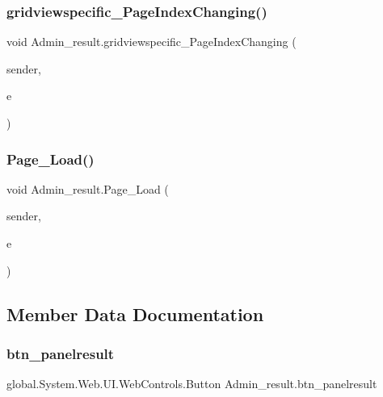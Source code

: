 \mbox{\label{class_admin__result_a49a732d0a1d0168c0895685950216e82}} 
\subsubsection{\texorpdfstring{gridviewspecific\_PageIndexChanging()}{gridviewspecific\_PageIndexChanging()}}
{\footnotesize\ttfamily void Admin\+\_\+result.\+gridviewspecific\+\_\+\+Page\+Index\+Changing (\begin{DoxyParamCaption}\item[{object}]{sender,  }\item[{Grid\+View\+Page\+Event\+Args}]{e }\end{DoxyParamCaption})\hspace{0.3cm}{\ttfamily [protected]}}

\mbox{\label{class_admin__result_aa4c21526d15278e1431660b24134f061}} 
\subsubsection{\texorpdfstring{Page\_Load()}{Page\_Load()}}
{\footnotesize\ttfamily void Admin\+\_\+result.\+Page\+\_\+\+Load (\begin{DoxyParamCaption}\item[{object}]{sender,  }\item[{Event\+Args}]{e }\end{DoxyParamCaption})\hspace{0.3cm}{\ttfamily [protected]}}



\subsection{Member Data Documentation}
\mbox{\label{class_admin__result_a1940c6a65e956c85a8f47b671fe01c1a}} 
\subsubsection{\texorpdfstring{btn\_panelresult}{btn\_panelresult}}
{\footnotesize\ttfamily global.\+System.\+Web.\+U\+I.\+Web\+Controls.\+Button Admin\+\_\+result.\+btn\+\_\+panelresult\hspace{0.3cm}{\ttfamily [protected]}}



